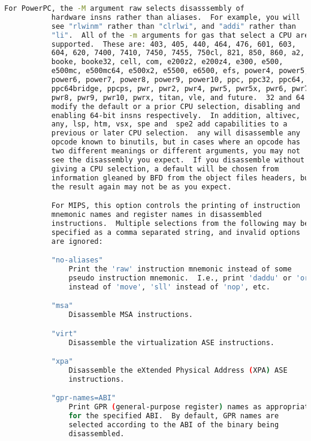 {{\begin{lstlisting}[language=bash]
           For PowerPC, the -M argument raw selects disasssembly of
           hardware insns rather than aliases.  For example, you will
           see "rlwinm" rather than "clrlwi", and "addi" rather than
           "li".  All of the -m arguments for gas that select a CPU are
           supported.  These are: 403, 405, 440, 464, 476, 601, 603,
           604, 620, 7400, 7410, 7450, 7455, 750cl, 821, 850, 860, a2,
           booke, booke32, cell, com, e200z2, e200z4, e300, e500,
           e500mc, e500mc64, e500x2, e5500, e6500, efs, power4, power5,
           power6, power7, power8, power9, power10, ppc, ppc32, ppc64,
           ppc64bridge, ppcps, pwr, pwr2, pwr4, pwr5, pwr5x, pwr6, pwr7,
           pwr8, pwr9, pwr10, pwrx, titan, vle, and future.  32 and 64
           modify the default or a prior CPU selection, disabling and
           enabling 64-bit insns respectively.  In addition, altivec,
           any, lsp, htm, vsx, spe and  spe2 add capabilities to a
           previous or later CPU selection.  any will disassemble any
           opcode known to binutils, but in cases where an opcode has
           two different meanings or different arguments, you may not
           see the disassembly you expect.  If you disassemble without
           giving a CPU selection, a default will be chosen from
           information gleaned by BFD from the object files headers, but
           the result again may not be as you expect.

           For MIPS, this option controls the printing of instruction
           mnemonic names and register names in disassembled
           instructions.  Multiple selections from the following may be
           specified as a comma separated string, and invalid options
           are ignored:

           "no-aliases"
               Print the 'raw' instruction mnemonic instead of some
               pseudo instruction mnemonic.  I.e., print 'daddu' or 'or'
               instead of 'move', 'sll' instead of 'nop', etc.

           "msa"
               Disassemble MSA instructions.

           "virt"
               Disassemble the virtualization ASE instructions.

           "xpa"
               Disassemble the eXtended Physical Address (XPA) ASE
               instructions.

           "gpr-names=ABI"
               Print GPR (general-purpose register) names as appropriate
               for the specified ABI.  By default, GPR names are
               selected according to the ABI of the binary being
               disassembled.


\end{lstlisting}}}
